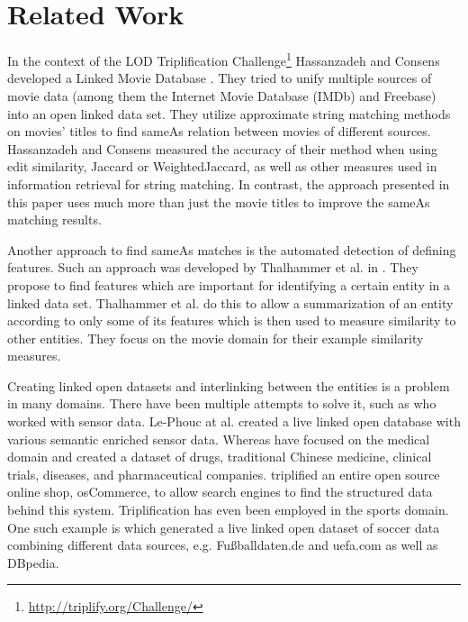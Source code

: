 \section{Related Work}
\label{sec_related_work}


In the context of the LOD Triplification Challenge\footnote{\url{http://triplify.org/Challenge/}} Hassanzadeh and Consens developed a Linked Movie Database \cite{LMDB}.
They tried to unify multiple sources of movie data (among them the Internet Movie Database (IMDb) and Freebase) into an open linked data set.
They utilize approximate string matching methods on movies' titles to find sameAs relation between movies of different sources.
Hassanzadeh and Consens measured the accuracy of their method when using edit similarity, Jaccard or WeightedJaccard, as well as other measures used in information retrieval for string matching.
In contrast, the approach presented in this paper uses much more than just the movie titles to improve the sameAs matching results.

Another approach to find sameAs matches is the automated detection of defining features. 
Such an approach was developed by Thalhammer et al. in \cite{MovieSummarization}.
They propose to find features which are important for identifying a certain entity in a linked data set.
Thalhammer et al. do this to allow a summarization of an entity according to only some of its features which is then used to measure similarity to other entities.
They focus on the movie domain for their example similarity measures.

Creating linked open datasets and interlinking between the entities is a problem in many domains. 
There have been multiple attempts to solve it, such as \cite{SensorData} who worked with sensor data. 
Le-Phouc at al. created a live linked open database with various semantic enriched sensor data.
Whereas \cite{openDrugData} have focused on the medical domain and created a dataset of drugs, traditional Chinese medicine, clinical trials, diseases, and pharmaceutical companies.
\cite{osCommerce} triplified an entire open source online shop, osCommerce, to allow search engines to find the structured data behind this system.  
Triplification has even been employed in the sports domain.
One such example is \cite{smm} which generated a live linked open dataset of soccer data combining different data sources, e.g. Fußballdaten.de and uefa.com as well as DBpedia.


